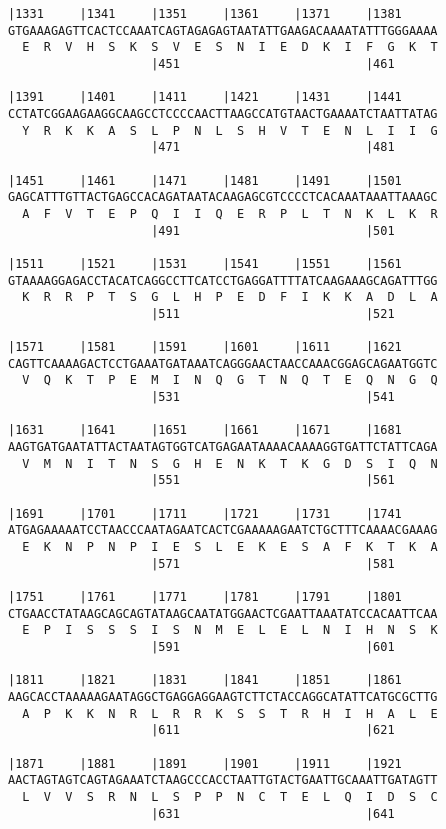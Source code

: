 \documentclass{article}
\begin{document}
\begin{Verbatim}
|1331     |1341     |1351     |1361     |1371     |1381     
GTGAAAGAGTTCACTCCAAATCAGTAGAGAGTAATATTGAAGACAAAATATTTGGGAAAA
  E  R  V  H  S  K  S  V  E  S  N  I  E  D  K  I  F  G  K  T
                    |451                          |461      
  
|1391     |1401     |1411     |1421     |1431     |1441     
CCTATCGGAAGAAGGCAAGCCTCCCCAACTTAAGCCATGTAACTGAAAATCTAATTATAG
  Y  R  K  K  A  S  L  P  N  L  S  H  V  T  E  N  L  I  I  G
                    |471                          |481      
  
|1451     |1461     |1471     |1481     |1491     |1501     
GAGCATTTGTTACTGAGCCACAGATAATACAAGAGCGTCCCCTCACAAATAAATTAAAGC
  A  F  V  T  E  P  Q  I  I  Q  E  R  P  L  T  N  K  L  K  R
                    |491                          |501      
  
|1511     |1521     |1531     |1541     |1551     |1561     
GTAAAAGGAGACCTACATCAGGCCTTCATCCTGAGGATTTTATCAAGAAAGCAGATTTGG
  K  R  R  P  T  S  G  L  H  P  E  D  F  I  K  K  A  D  L  A
                    |511                          |521      
  
|1571     |1581     |1591     |1601     |1611     |1621     
CAGTTCAAAAGACTCCTGAAATGATAAATCAGGGAACTAACCAAACGGAGCAGAATGGTC
  V  Q  K  T  P  E  M  I  N  Q  G  T  N  Q  T  E  Q  N  G  Q
                    |531                          |541      
  
|1631     |1641     |1651     |1661     |1671     |1681     
AAGTGATGAATATTACTAATAGTGGTCATGAGAATAAAACAAAAGGTGATTCTATTCAGA
  V  M  N  I  T  N  S  G  H  E  N  K  T  K  G  D  S  I  Q  N
                    |551                          |561      
  
|1691     |1701     |1711     |1721     |1731     |1741     
ATGAGAAAAATCCTAACCCAATAGAATCACTCGAAAAAGAATCTGCTTTCAAAACGAAAG
  E  K  N  P  N  P  I  E  S  L  E  K  E  S  A  F  K  T  K  A
                    |571                          |581      
  
|1751     |1761     |1771     |1781     |1791     |1801     
CTGAACCTATAAGCAGCAGTATAAGCAATATGGAACTCGAATTAAATATCCACAATTCAA
  E  P  I  S  S  S  I  S  N  M  E  L  E  L  N  I  H  N  S  K
                    |591                          |601      
  
|1811     |1821     |1831     |1841     |1851     |1861     
AAGCACCTAAAAAGAATAGGCTGAGGAGGAAGTCTTCTACCAGGCATATTCATGCGCTTG
  A  P  K  K  N  R  L  R  R  K  S  S  T  R  H  I  H  A  L  E
                    |611                          |621      
  
|1871     |1881     |1891     |1901     |1911     |1921     
AACTAGTAGTCAGTAGAAATCTAAGCCCACCTAATTGTACTGAATTGCAAATTGATAGTT
  L  V  V  S  R  N  L  S  P  P  N  C  T  E  L  Q  I  D  S  C
                    |631                          |641      
  

\end{Verbatim}
\end{document}
